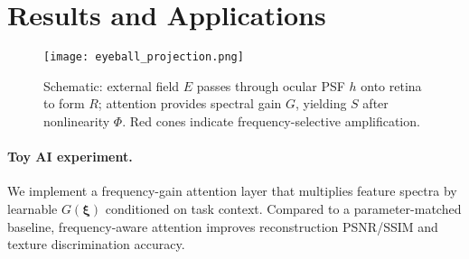 \documentclass[12pt]{article}
\begin{document}
\section{Results and Applications}\label{sec:results}
%
%
%
%
\begin{figure}[h]
  \centering
  \texttt{[image: eyeball\_projection.png]}
  \caption{Schematic: external field $E$ passes through ocular PSF $h$ onto retina to form $R$; attention provides spectral gain $G$, yielding $S$ after nonlinearity $\Phi$. Red cones indicate frequency-selective amplification.}
  \label{fig:projection}
\end{figure}

\paragraph{Toy AI experiment.}
We implement a frequency-gain attention layer that multiplies feature spectra by learnable $G(\bm{\xi})$ conditioned on task context. Compared to a parameter-matched baseline, frequency-aware attention improves reconstruction PSNR/SSIM and texture discrimination accuracy. %
\end{document}
